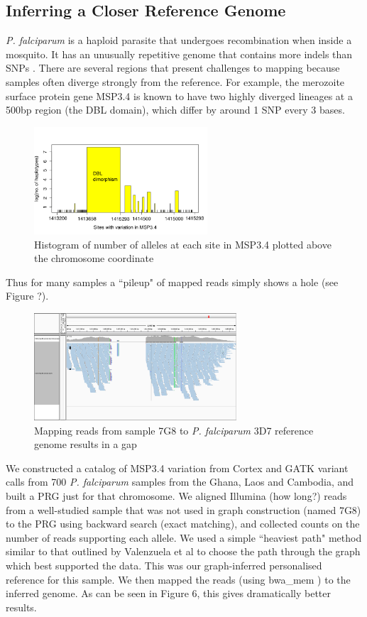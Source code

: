 \documentclass[runningheads,a4paper]{llncs}
\begin{document}
\subsection{Inferring a Closer Reference Genome}
\textit{P. falciparum} is a haploid parasite that undergoes recombination when inside a mosquito. It has an unusually  repetitive genome that contains more indels than SNPs \cite{miles}. There are several regions that present challenges to mapping because samples often diverge strongly from the reference. For example, the merozoite surface protein gene MSP3.4 is known to have two highly diverged lineages at a 500bp region (the DBL domain), which differ by around 1 SNP every 3 bases.


\begin{figure}
\centering
\includegraphics[height=4cm]{PRG.png}
\caption{Histogram of number of alleles at each site in MSP3.4 plotted above the chromosome coordinate}
\label{fig:example}
\end{figure}


Thus for many samples a ``pileup" of mapped reads simply shows a hole (see Figure ?). 


\begin{figure}
\centering
\includegraphics[height=4cm]{7G8_to_3D7_pileup.png}
\caption{Mapping reads from sample 7G8 to \textit{P. falciparum} 3D7 reference genome results in a gap}
\label{fig:example}
\end{figure}



We constructed a catalog of MSP3.4 variation from Cortex \cite{iqbal} and GATK \cite{depristo} variant calls from 700 \textit{P. falciparum} samples from the Ghana, Laos and Cambodia, and built a PRG just for that chromosome. We aligned Illumina (how long?) reads from a well-studied sample that was not used in graph construction (named 7G8) to the PRG using backward search (exact matching), and collected counts on the number of reads supporting each allele. We used a simple ``heaviest path" method similar to that outlined by Valenzuela et al \cite{valen} to choose the path through the graph which best supported the data. This was our graph-inferred personalised reference for this sample. We then mapped the reads (using bwa\_mem \cite{hengli}) to the inferred genome. As can be seen in Figure 6,  this gives dramatically better results.
\end{document}
